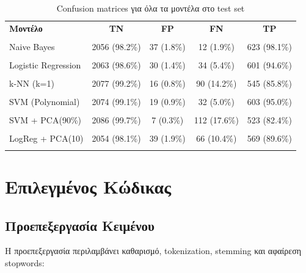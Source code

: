 \documentclass[12pt,a4paper,twoside]{book}
\begin{document}
\begin{table}[H]
    \centering
    \small
    \begin{tabular}{lcccc}
        \hline
        \textbf{Μοντέλο}    & \textbf{TN}   & \textbf{FP} & \textbf{FN}  & \textbf{TP}  \\\\
        \hline
        Naive Bayes         & 2056 (98.2\%) & 37 (1.8\%)  & 12 (1.9\%)   & 623 (98.1\%) \\\\
        Logistic Regression & 2063 (98.6\%) & 30 (1.4\%)  & 34 (5.4\%)   & 601 (94.6\%) \\\\
        k-NN (k=1)          & 2077 (99.2\%) & 16 (0.8\%)  & 90 (14.2\%)  & 545 (85.8\%) \\\\
        SVM (Polynomial)    & 2074 (99.1\%) & 19 (0.9\%)  & 32 (5.0\%)   & 603 (95.0\%) \\\\
        SVM + PCA(90\%)     & 2086 (99.7\%) & 7 (0.3\%)   & 112 (17.6\%) & 523 (82.4\%) \\\\
        LogReg + PCA(10)    & 2054 (98.1\%) & 39 (1.9\%)  & 66 (10.4\%)  & 569 (89.6\%) \\\\
        \hline
    \end{tabular}
    \caption{Confusion matrices για όλα τα μοντέλα στο test set}
\end{table}

\chapter{Επιλεγμένος Κώδικας}

\section{Προεπεξεργασία Κειμένου}

Η προεπεξεργασία περιλαμβάνει καθαρισμό, tokenization, stemming και αφαίρεση stopwords:
\end{document}
